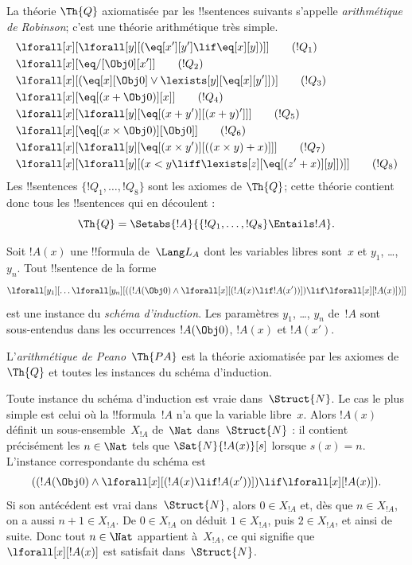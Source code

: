 \documentclass[../../../include/open-logic-section]{subfiles}
\begin{document}
\begin{defn}
La théorie $\Th{Q}$ axiomatisée par les !!{sentence}s suivants
s'appelle \emph{arithmétique de Robinson}; c'est une théorie
arithmétique très simple.
\begin{align*}
& \lforall[x][\lforall[y][(\eq[x'][y'] \lif \eq[x][y])]] \tag{$!Q_1$}\\
& \lforall[x][\eq/[\Obj 0][x']] \tag{$!Q_2$}\\
& \lforall[x][(\eq[x][\Obj 0] \lor \lexists[y][\eq[x][y']])] \tag{$!Q_3$}\\
& \lforall[x][\eq[(x + \Obj 0)][x]] \tag{$!Q_4$}\\
& \lforall[x][\lforall[y][\eq[(x + y')][(x + y)']]] \tag{$!Q_5$}\\
& \lforall[x][\eq[(x \times \Obj 0)][\Obj 0]] \tag{$!Q_6$}\\
& \lforall[x][\lforall[y][\eq[(x \times y')][((x \times y) + x)]]] \tag{$!Q_7$}\\
& \lforall[x][\lforall[y][(x < y \liff \lexists[z][\eq[(z' + x)][y]])]] \tag{$!Q_8$}
\end{align*}
Les !!{sentence}s $\{!Q_1,\dots,!Q_8\}$ sont les axiomes de
$\Th{Q}$; cette théorie contient donc tous les !!{sentence}s qui
en découlent :
\[
\Th{Q} = \Setabs{!A}{\{!Q_1, \dots, !Q_8\} \Entails !A}.
\]
\end{defn}

\begin{defn}
Soit $!A(x)$ une !!{formula} de~$\Lang L_A$ dont les variables libres
sont~$x$ et $y_1$, \dots, $y_n$. Tout !!{sentence} de la forme
\[
\lforall[y_1][\dots\lforall[y_n][((!A(\Obj 0) \land \lforall[x][(!A(x)
\lif !A(x'))]) \lif \lforall[x][!A(x)])]]
\]
est une instance du \emph{schéma d'induction}. Les paramètres
$y_1$, \dots, $y_n$ de~$!A$ sont sous-entendus dans les occurrences
$!A(\Obj 0)$, $!A(x)$ et $!A(x')$.

L'\emph{arithmétique de Peano}~$\Th{PA}$ est la théorie axiomatisée
par les axiomes de~$\Th{Q}$ et toutes les instances du schéma
d'induction.
\end{defn}

\begin{explain}
Toute instance du schéma d'induction est vraie dans~$\Struct{N}$.
Le cas le plus simple est celui où la !!{formula}~$!A$ n'a que la
variable libre~$x$. Alors $!A(x)$ définit un sous-ensemble~$X_{!A}$
de~$\Nat$ dans~$\Struct{N}$ : il contient précisément les
$n\in\Nat$ tels que $\Sat{N}{!A(x)}[s]$ lorsque $s(x)=n$.
L'instance correspondante du schéma est
\[
((!A(\Obj 0) \land \lforall[x][(!A(x) \lif !A(x'))]) \lif
  \lforall[x][!A(x)]).
\]
Si son antécédent est vrai dans~$\Struct{N}$, alors $0\in X_{!A}$
et, dès que $n\in X_{!A}$, on a aussi $n+1\in X_{!A}$. De
$0\in X_{!A}$ on déduit $1\in X_{!A}$, puis $2\in X_{!A}$,
et ainsi de suite. Donc tout $n\in\Nat$ appartient à~$X_{!A}$,
ce qui signifie que $\lforall[x][!A(x)]$ est satisfait
dans~$\Struct{N}$.
\end{explain}
\end{document}
